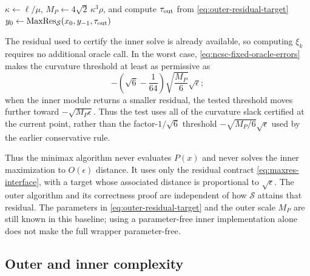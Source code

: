 \documentclass{article}
\begin{document}
\begin{algorithm}[H]
\DontPrintSemicolon
\caption{Certificate-sharp fixed-scale NC--SC UTR}
\label{alg:ncsc-utr}
$\kappa\leftarrow\ell/\mu$,
$M_P\leftarrow4\sqrt2\,\kappa^3\rho$,
and compute $\tau_{\rm out}$ from
\eqref{eq:outer-residual-target}\;
$y_0\leftarrow
 \operatorname{MaxRes}_{\mathcal S}(x_0,y_{-1},\tau_{\rm out})$\;
\end{algorithm}

The residual used to certify the inner solve is already available, so
computing $\xi_k$ requires no additional oracle call.  In the worst
case, \eqref{eq:ncsc-fixed-oracle-errors} makes the curvature threshold
at least as permissive as
\[
 -\left(\sqrt6-\frac1{64}\right)
   \sqrt{\frac{M_P}{6}}\sqrt\epsilon;
\]
when the inner module returns a smaller residual, the tested threshold
moves further toward $-\sqrt{M_P\epsilon}$.  Thus the test uses all of
the curvature slack certified at the current point, rather than the
factor-$1/\sqrt6$ threshold
$-\sqrt{M_P/6}\sqrt\epsilon$ used by the earlier conservative rule.

Thus the minimax algorithm never evaluates $P(x)$ and never solves the
inner maximization to $O(\epsilon)$ distance.  It uses only the residual
contract \eqref{eq:maxres-interface}, with a target whose associated
distance is proportional to $\sqrt\epsilon$.  The outer algorithm and
its correctness proof are independent of how $\mathcal S$ attains that
residual.  The parameters in \eqref{eq:outer-residual-target} and the
outer scale $M_P$ are still known in this baseline; using a
parameter-free inner implementation alone does not make the full
wrapper parameter-free.

\subsection{Outer and inner complexity}
\end{document}
